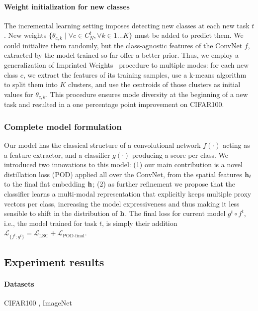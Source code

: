 \paragraph{Weight initialization for new classes} The incremental learning setting imposes detecting new
classes at each new task $t$. New weights $\{\theta_{c,k} \mid \forall c \in C^t_N, \forall k \in
    {1...K}\}$ must be added to predict them. We could initialize them randomly, but the class-agnostic
features of the ConvNet $f$, extracted by the model trained so far offer a better prior. Thus, we
employ a generalization of Imprinted Weights~\citep{qi2018imprintedweights} procedure to multiple
modes: for each new class $c$, we extract the features of its training samples, use a k-means
algorithm to split them into $K$ clusters, and use the centroids of those clusters as initial values
for $\theta_{c,k}$. This procedure ensures mode diversity at the beginning of a new task and
resulted in a one percentage point improvement on CIFAR100.


\subsubsection{Complete model formulation}

Our model has the classical structure of a convolutional network $f(\cdot)$ acting as a feature
extractor, and a classifier $g(\cdot)$ producing a score per class. We introduced two innovations to
this model: (1) our main contribution is a novel distillation loss (POD) applied all over the
ConvNet, from the spatial features $\mathbf{h}_\ell$ to the final flat embedding $\mathbf{h}$; (2) as further
refinement we propose that the classifier learns a multi-modal representation that explicitly keeps
multiple proxy vectors per class, increasing the model expressiveness and thus making it less
sensible to shift in the distribution of $\mathbf{h}$. The final loss for current model $g^t \circ f^t$,
i.e., the model trained for task $t$, is simply their addition $\mathcal{L}_{\{f^t; g^t\}} =
    \mathcal{L}_\textrm{LSC} + \mathcal{L}_\textrm{POD-final}$.

\subsection{Experiment results}

\paragraph{Datasets} CIFAR100 \citep{krizhevskycifar100}, ImageNet \citep{deng2009imagenet}


